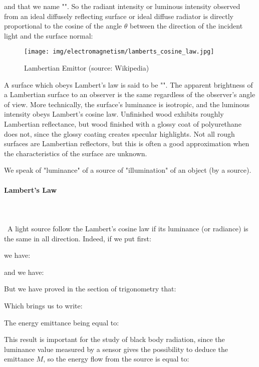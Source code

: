 	and that we name "". So  the radiant intensity or luminous intensity observed from an ideal diffusely reflecting surface or ideal diffuse radiator is directly proportional to the cosine of the angle $\theta$ between the direction of the incident light and the surface normal:
	\begin{figure}[H]
		\centering
		\texttt{[image: img/electromagnetism/lamberts\_cosine\_law.jpg]}
		\caption[Lambertian Emittor]{Lambertian Emittor (source: Wikipedia)}
	\end{figure}
	A surface which obeys Lambert's law is said to be "". The apparent brightness of a Lambertian surface to an observer is the same regardless of the observer's angle of view. More technically, the surface's luminance is isotropic, and the luminous intensity obeys Lambert's cosine law. Unfinished wood exhibits roughly Lambertian reflectance, but wood finished with a glossy coat of polyurethane does not, since the glossy coating creates specular highlights. Not all rough surfaces are Lambertian reflectors, but this is often a good approximation when the characteristics of the surface are unknown.
	\begin{tcolorbox}[title=Remark,colframe=black,arc=10pt]
	We speak of "luminance" of a source of "illumination" of an object (by a source).
	\end{tcolorbox}
	
	\pagebreak
	\paragraph{Lambert's Law}\mbox{}\\\\\
	A light source follow the Lambert's cosine law if its luminance (or radiance) is the same in all direction. Indeed, if we put first:
	
	we have:
	
	and we have:
	
	But we have proved in the section of trigonometry that:
	
	Which brings us to write:
	
	The energy emittance being equal to:
	
	This result is important for the study of black body radiation, since the luminance value measured by a sensor gives the possibility to deduce the emittance $M$, so the energy flow from the source is equal to: 
	

